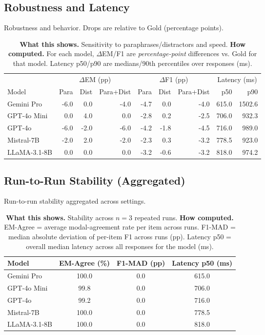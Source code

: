\subsection{Robustness and Latency}
\begin{table}[H]\centering
\caption{Robustness and behavior. Drops are relative to Gold (percentage points).}
\label{tab:robustness-behavior}
\scriptsize
\setlength{\tabcolsep}{4pt}
\renewcommand{\arraystretch}{1.05}
\begin{tabular}{l rrr rrr rr}
\toprule
& \multicolumn{3}{c}{\(\Delta\)EM (pp)} & \multicolumn{3}{c}{\(\Delta\)F1 (pp)} & \multicolumn{2}{c}{Latency (ms)} \\
\cmidrule(lr){2-4}\cmidrule(lr){5-7}\cmidrule(lr){8-9}
Model & Para & Dist & Para+Dist & Para & Dist & Para+Dist & p50 & p90 \\
\midrule
Gemini Pro & -6.0 & 0.0 & -4.0 & -4.7 & 0.0 & -4.0 & 615.0 & 1502.6 \\
GPT-4o Mini & 0.0 & 4.0 & 0.0 & -2.8 & 0.2 & -2.5 & 706.0 & 932.3 \\
GPT-4o & -6.0 & -2.0 & -6.0 & -4.2 & -1.8 & -4.5 & 716.0 & 989.0 \\
Mistral-7B & -2.0 & 2.0 & -2.0 & -2.3 & 0.3 & -3.2 & 778.5 & 923.0 \\
LLaMA-3.1-8B & 0.0 & 0.0 & 0.0 & -3.2 & -0.6 & -3.2 & 818.0 & 974.2 \\
\bottomrule
\end{tabular}
\caption*{\scriptsize
\textbf{What this shows.} Sensitivity to paraphrases/distractors and speed.\;
\textbf{How computed.} For each model, $\Delta$EM/F1 are \emph{percentage-point} differences vs. Gold for that model. Latency p50/p90 are medians/90th percentiles over responses (ms).}
\end{table}

\subsection{Run-to-Run Stability (Aggregated)}
\begin{table}[H]\centering
\caption{Run-to-run stability aggregated across settings.}
\label{tab:stability}
\small
\setlength{\tabcolsep}{5pt}
\renewcommand{\arraystretch}{1.05}
\begin{tabular}{lccc}
\toprule
Model & EM-Agree (\%) & F1-MAD (pp) & Latency p50 (ms) \\
\midrule
Gemini Pro & 100.0 & 0.0 & 615.0 \\
GPT-4o Mini & 99.8 & 0.0 & 706.0 \\
GPT-4o & 99.2 & 0.0 & 716.0 \\
Mistral-7B & 100.0 & 0.0 & 778.5 \\
LLaMA-3.1-8B & 100.0 & 0.0 & 818.0 \\
\bottomrule
\end{tabular}
\caption*{\scriptsize
\textbf{What this shows.} Stability across $n=3$ repeated runs.\;
\textbf{How computed.} EM-Agree = average modal-agreement rate per item across runs. 
F1-MAD = median absolute deviation of per-item F1 across runs (pp). 
Latency p50 = overall median latency across all responses for the model (ms).}
\end{table}

